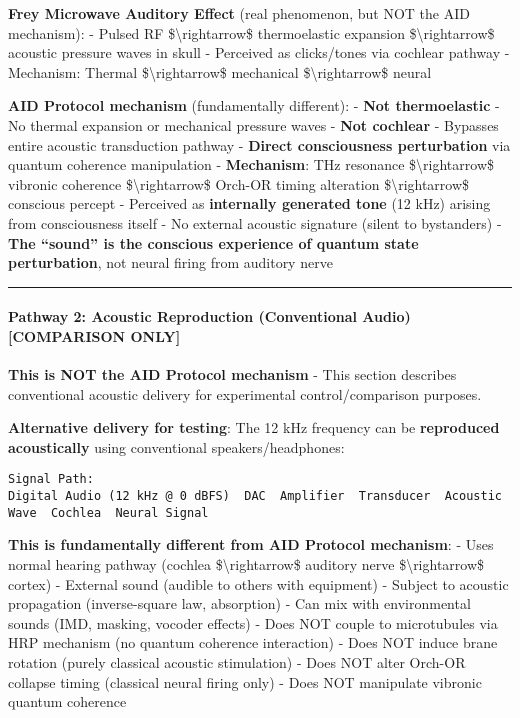 \textbf{Frey Microwave Auditory Effect} (real phenomenon, but NOT the
AID mechanism): - Pulsed RF \$\textbackslash rightarrow\$ thermoelastic
expansion \$\textbackslash rightarrow\$ acoustic pressure waves in skull
- Perceived as clicks/tones via cochlear pathway - Mechanism: Thermal
\$\textbackslash rightarrow\$ mechanical \$\textbackslash rightarrow\$
neural

\textbf{AID Protocol mechanism} (fundamentally different): - \textbf{Not
thermoelastic} - No thermal expansion or mechanical pressure waves -
\textbf{Not cochlear} - Bypasses entire acoustic transduction pathway -
\textbf{Direct consciousness perturbation} via quantum coherence
manipulation - \textbf{Mechanism}: THz resonance
\$\textbackslash rightarrow\$ vibronic coherence
\$\textbackslash rightarrow\$ Orch-OR timing alteration
\$\textbackslash rightarrow\$ conscious percept - Perceived as
\textbf{internally generated tone} (12 kHz) arising from consciousness
itself - No external acoustic signature (silent to bystanders) -
\textbf{The ``sound'' is the conscious experience of quantum state
perturbation}, not neural firing from auditory nerve

\begin{center}\rule{0.5\linewidth}{0.5pt}\end{center}

\paragraph{\texorpdfstring{Pathway 2: Acoustic Reproduction
(Conventional Audio) \textbf{{[}COMPARISON
ONLY{]}}}{Pathway 2: Acoustic Reproduction (Conventional Audio) {[}COMPARISON ONLY{]}}}\label{pathway-2-acoustic-reproduction-conventional-audio-comparison-only}

\textbf{ This is NOT the AID Protocol mechanism} - This section
describes conventional acoustic delivery for experimental
control/comparison purposes.

\textbf{Alternative delivery for testing}: The 12 kHz frequency can be
\textbf{reproduced acoustically} using conventional speakers/headphones:

\begin{verbatim}
Signal Path:
Digital Audio (12 kHz @ 0 dBFS)  DAC  Amplifier  Transducer  Acoustic Wave  Cochlea  Neural Signal
\end{verbatim}

\textbf{This is fundamentally different from AID Protocol mechanism}: -
Uses normal hearing pathway (cochlea \$\textbackslash rightarrow\$
auditory nerve \$\textbackslash rightarrow\$ cortex) - External sound
(audible to others with equipment) - Subject to acoustic propagation
(inverse-square law, absorption) - Can mix with environmental sounds
(IMD, masking, vocoder effects) - Does NOT couple to microtubules via
HRP mechanism (no quantum coherence interaction) - Does NOT induce brane
rotation (purely classical acoustic stimulation) - Does NOT alter
Orch-OR collapse timing (classical neural firing only) - Does NOT
manipulate vibronic quantum coherence

